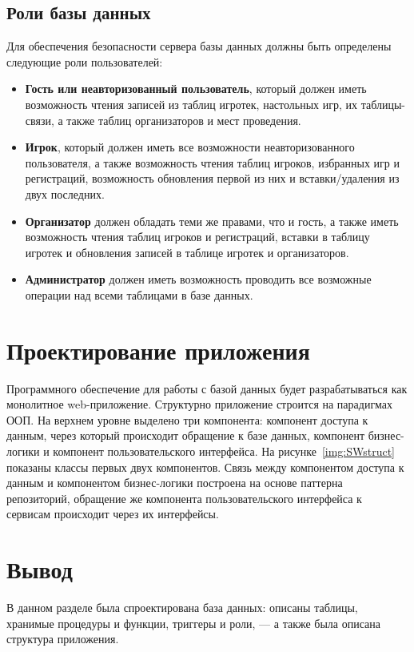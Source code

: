 
\subsection{Роли базы данных}

Для обеспечения безопасности сервера базы данных должны быть определены
следующие роли пользователей:

\begin{itemize}
    \item \textbf{Гость или неавторизованный пользователь}, который должен иметь
        возможность чтения записей из таблиц игротек, настольных игр, их
        таблицы-связи, а также таблиц организаторов и мест проведения.
    \item \textbf{Игрок}, который должен иметь все возможности неавторизованного
        пользователя, а также возможность чтения таблиц игроков, избранных игр и
        регистраций, возможность обновления первой из них и вставки/удаления из
        двух последних.
    \item \textbf{Организатор} должен обладать теми же правами, что и гость, а
        также иметь возможность чтения таблиц игроков и регистраций, вставки в
        таблицу игротек и обновления записей в таблице игротек и организаторов.
    \item \textbf{Администратор} должен иметь возможность проводить все
        возможные операции над всеми таблицами в базе данных.
\end{itemize}

\section{Проектирование приложения}

Программного обеспечение для работы с базой данных будет разрабатываться как
монолитное web-приложение.  Структурно приложение строится на парадигмах ООП. На
верхнем уровне выделено три компонента: компонент доступа к данным, через
который происходит обращение к базе данных, компонент бизнес-логики и компонент
пользовательского интерфейса.  На рисунке~\ref{img:SWstruct} показаны классы
первых двух компонентов.  Связь между компонентом доступа к данным и компонентом
бизнес-логики построена на основе паттерна репозиторий, обращение же компонента
пользовательского интерфейса к сервисам происходит через их интерфейсы.

\section*{Вывод}

В данном разделе была спроектирована база данных: описаны таблицы, хранимые
процедуры и функции, триггеры и роли, --- а также была описана структура
приложения.

\clearpage
{}
~\\
~\\
~\\
